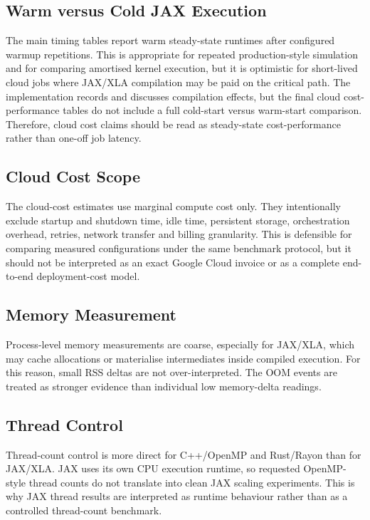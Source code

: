 \subsection{Warm versus Cold JAX Execution}
\label{subsec:limitations-cold-warm}

The main timing tables report warm steady-state runtimes after configured
warmup repetitions. This is appropriate for repeated production-style
simulation and for comparing amortised kernel execution, but it is optimistic
for short-lived cloud jobs where JAX/XLA compilation may be paid on the
critical path. The implementation records and discusses compilation effects,
but the final cloud cost-performance tables do not include a full cold-start
versus warm-start comparison. Therefore, cloud cost claims should be read as
steady-state cost-performance rather than one-off job latency.

\subsection{Cloud Cost Scope}
\label{subsec:limitations-cloud-cost}

The cloud-cost estimates use marginal compute cost only. They intentionally
exclude startup and shutdown time, idle time, persistent storage, orchestration
overhead, retries, network transfer and billing granularity. This is defensible
for comparing measured configurations under the same benchmark protocol, but it
should not be interpreted as an exact Google Cloud invoice or as a complete
end-to-end deployment-cost model.

\subsection{Memory Measurement}
\label{subsec:limitations-memory-measurement}

Process-level memory measurements are coarse, especially for JAX/XLA, which
may cache allocations or materialise intermediates inside compiled execution.
For this reason, small RSS deltas are not over-interpreted.  The OOM events
are treated as stronger evidence than individual low memory-delta readings.

\subsection{Thread Control}
\label{subsec:limitations-thread-control}

Thread-count control is more direct for C++/OpenMP and Rust/Rayon than for
JAX/XLA.  JAX uses its own CPU execution runtime, so requested OpenMP-style
thread counts do not translate into clean JAX scaling experiments.  This is
why JAX thread results are interpreted as runtime behaviour rather than as a
controlled thread-count benchmark.

